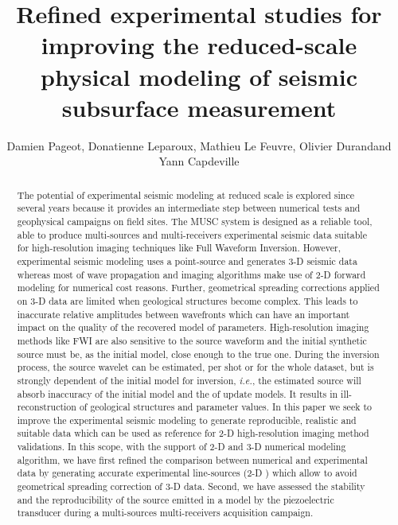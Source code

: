 \documentclass[manuscript,revised]{geophysics}
\newcommand{\twod}{2-D }
\newcommand{\thrd}{3-D }
\begin{document}
\title{Refined experimental studies for improving the reduced-scale physical modeling of seismic subsurface measurement}

\renewcommand{\thefootnote}{\fnsymbol{footnote}} 


\address{
\footnotemark[1]LUNAM-IFSTTAR, \\
\footnotemark[2]OSUNA \\
\footnotemark[1]LPGN, \\}
\author{Damien Pageot\footnotemark[1]\footnotemark[2], Donatienne Leparoux\footnotemark[1], Mathieu Le Feuvre\footnotemark[1], Olivier Durand\footnotemark[1] and Yann Capdeville\footnotemark[3]}


\maketitle

\begin{abstract}
\noindent The potential of experimental seismic modeling at reduced scale is explored since several years because it provides an intermediate step between numerical tests and geophysical campaigns on field sites. The MUSC system is designed as a reliable tool, able to produce multi-sources and multi-receivers experimental seismic data suitable for high-resolution imaging techniques like Full Waveform Inversion. However, experimental seismic modeling uses a point-source and generates 3-D seismic data whereas most of wave propagation and imaging algorithms make use of \twod forward modeling for numerical cost reasons. Further, geometrical spreading corrections applied on \thrd data are limited when geological structures become complex. This leads to inaccurate relative amplitudes between wavefronts which can have an important impact on the quality of the recovered model of parameters. High-resolution imaging methods like FWI are also sensitive to the source waveform and the initial synthetic source must be, as the initial model, close enough to the true one. During the inversion process, the source wavelet can be estimated, per shot or for the whole dataset, but is strongly dependent of the initial model for inversion, \textit{i.e.}, the estimated source will absorb inaccuracy of the initial model and the of update models. It results in ill-reconstruction of geological structures and parameter values. In this paper we seek to improve the experimental seismic modeling to generate reproducible, realistic and suitable data which can be used as reference for \twod high-resolution imaging method validations. In this scope, with the support of \twod and \thrd numerical modeling algorithm, we have first refined the comparison between numerical and experimental data by generating accurate experimental line-sources (\twod) which allow to avoid geometrical spreading correction of \thrd data. Second, we have assessed the stability and the reproducibility of the source emitted in a model by the piezoelectric transducer during a multi-sources multi-receivers acquisition campaign.
\end{abstract}
\end{document}
